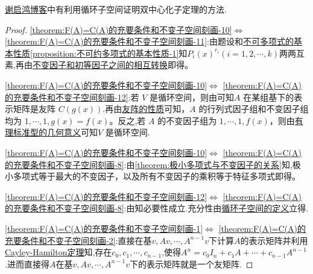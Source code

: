 \documentclass[../../main.tex]{subfiles}%
\begin{document}
\begin{note}
\href{https://www.doc88.com/p-9827401091114.html}{谢启鸿博客}中有利用循环子空间证明双中心化子定理的方法.
\end{note}
\begin{proof}
\noindent\ref{theorem:F(A)=C(A)的充要条件和不变子空间刻画-10}$\Leftrightarrow$ \ref{theorem:F(A)=C(A)的充要条件和不变子空间刻画-11}:由题设和\hyperref[proposition:不可约多项式的基本性质]{不可多项式的基本性质\cref{proposition:不可约多项式的基本性质-1}}知$P_i(x)^{r_i}(i=1,2,\cdots,k)$两两互素,再由\hyperref[proposition:初等因子组与不变因子组相互唯一确定]{不变因子和初等因子之间的相互转换}即得。

\noindent\ref{theorem:F(A)=C(A)的充要条件和不变子空间刻画-10}$\Leftrightarrow$ \ref{theorem:F(A)=C(A)的充要条件和不变子空间刻画-12}:若 \(V\) 是循环空间，则由可知\(A\) 在某组基下的表示矩阵是友阵 \(C(g(x))\).再由\hyperref[lemma:Frobenius标准型矩阵的极小多项式和不变因子]{友阵的性质}可知，\(A\) 的行列式因子组和不变因子组均为 \(1,\cdots,1,g(x)=f(x)\)。反之,若 \(A\) 的不变因子组为 \(1,\cdots,1,f(x)\)，则由\hyperref[theorem:有理标准型的几何意义]{有理标准型的几何意义}可知\(V\) 是循环空间.

\noindent\ref{theorem:F(A)=C(A)的充要条件和不变子空间刻画-10}$\Leftrightarrow$ \ref{theorem:F(A)=C(A)的充要条件和不变子空间刻画-8}:由\cref{theorem:极小多项式与不变因子的关系}知,极小多项式等于最大的不变因子，以及所有不变因子的乘积等于特征多项式即得。 

\noindent\ref{theorem:F(A)=C(A)的充要条件和不变子空间刻画-12}$\Leftrightarrow$ \ref{theorem:F(A)=C(A)的充要条件和不变子空间刻画-8}:由知必要性成立.充分性由\hyperref[definition:循环子空间和循环空间]{循环子空间的定义}立得.

\noindent\ref{theorem:F(A)=C(A)的充要条件和不变子空间刻画-1}$\Leftrightarrow$ \ref{theorem:F(A)=C(A)的充要条件和不变子空间刻画-2}:直接在基$v,Av,\cdots,A^{n-1}v$下计算$A$的表示矩阵并利用\hyperref[theorem:Cayley-Hamilton定理]{Cayley-Hamilton定理}知,存在$c_0,c_1,\cdots,c_{n-1}$,使得$A^n=c_0I_n+c_1A+\cdots+c_{n-1}A^{n-1}$.进而直接得$A$在基$v,Av,\cdots,A^{n-1}v$下的表示矩阵就是一个友矩阵.


\end{proof}
\end{document}
